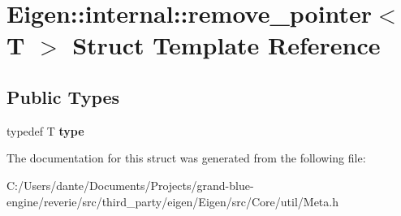 \hypertarget{struct_eigen_1_1internal_1_1remove__pointer}{}\section{Eigen\+::internal\+::remove\+\_\+pointer$<$ T $>$ Struct Template Reference}
\label{struct_eigen_1_1internal_1_1remove__pointer}
\subsection*{Public Types}
\begin{DoxyCompactItemize}
\item 
\mbox{\label{struct_eigen_1_1internal_1_1remove__pointer_a28a02b4829fe9316ccfde57fdfe08e9c}} 
typedef T {\bfseries type}
\end{DoxyCompactItemize}


The documentation for this struct was generated from the following file\+:\begin{DoxyCompactItemize}
\item 
C\+:/\+Users/dante/\+Documents/\+Projects/grand-\/blue-\/engine/reverie/src/third\+\_\+party/eigen/\+Eigen/src/\+Core/util/Meta.\+h\end{DoxyCompactItemize}
